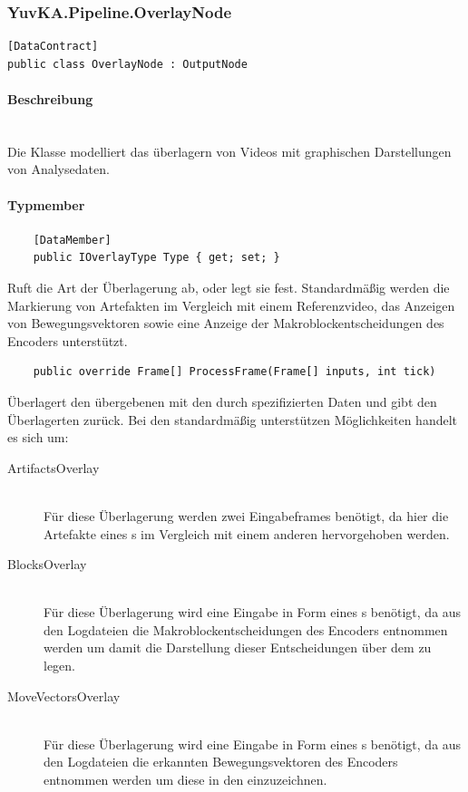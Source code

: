 \subsubsection{YuvKA.Pipeline.OverlayNode}

\begin{verbatim}
[DataContract]
public class OverlayNode : OutputNode
\end{verbatim}

\paragraph{Beschreibung}~\\
Die Klasse  modelliert das überlagern von Videos mit graphischen Darstellungen von Analysedaten.

\paragraph{Typmember}
\begin{itemize}

	\begin{verbatim}
	[DataMember]
	public IOverlayType Type { get; set; }
	\end{verbatim}
	Ruft die Art der Überlagerung ab, oder legt sie fest. Standardmäßig werden die Markierung von Artefakten im Vergleich mit einem Referenzvideo, das Anzeigen von Bewegungsvektoren sowie eine Anzeige der Makroblockentscheidungen des Encoders unterstützt.

	\begin{verbatim}
	public override Frame[] ProcessFrame(Frame[] inputs, int tick)
	\end{verbatim}
	Überlagert den übergebenen  mit den durch  spezifizierten Daten und gibt den Überlagerten  zurück. Bei den standardmäßig unterstützen Möglichkeiten handelt es sich um:
	\begin{description}
		\item[ArtifactsOverlay]~\\
			Für diese Überlagerung werden zwei Eingabeframes benötigt, da hier die Artefakte eines s im Vergleich mit einem anderen hervorgehoben werden.
		\item[BlocksOverlay]~\\
			Für diese Überlagerung wird eine Eingabe in Form eines s benötigt, da aus den Logdateien die Makroblockentscheidungen des Encoders entnommen werden um damit die Darstellung dieser Entscheidungen über dem  zu legen.
		\item[MoveVectorsOverlay]~\\
			Für diese Überlagerung wird eine Eingabe in Form eines s benötigt, da aus den Logdateien die erkannten Bewegungsvektoren des Encoders entnommen werden um diese in den  einzuzeichnen.
	\end{description}
	
\end{itemize}
